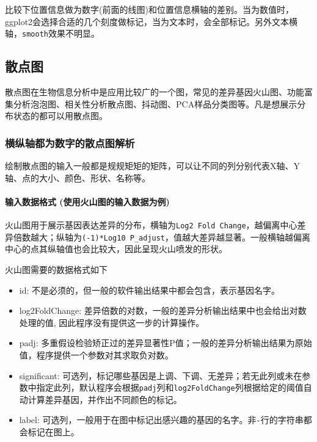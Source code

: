 \documentclass[]{article}
\providecommand{\tightlist}{%
  \setlength{\itemsep}{0pt}\setlength{\parskip}{0pt}}
\numberwithin{figure}{section}
\numberwithin{table}{section}
\theoremstyle{definition}
\theoremstyle{definition}
\theoremstyle{definition}
\theoremstyle{remark}
\begin{document}
比较下位置信息做为数字(前面的线图)和位置信息横轴的差别。当为数值时，ggplot2会选择合适的几个刻度做标记，当为文本时，会全部标记。另外文本横轴，\texttt{smooth}效果不明显。

\subsection{散点图}

散点图在生物信息分析中是应用比较广的一个图，常见的差异基因火山图、功能富集分析泡泡图、相关性分析散点图、抖动图、PCA样品分类图等。凡是想展示分布状态的都可以用散点图。

\subsubsection{横纵轴都为数字的散点图解析}

绘制散点图的输入一般都是规规矩矩的矩阵，可以让不同的列分别代表X轴、Y轴、点的大小、颜色、形状、名称等。

\paragraph{输入数据格式 (使用火山图的输入数据为例)}\label{-}

火山图用于展示基因表达差异的分布，横轴为\texttt{Log2\ Fold\ Change}，越偏离中心差异倍数越大；纵轴为\texttt{(-1)*Log10\ P\_adjust}，值越大差异越显著。一般横轴越偏离中心的点其纵轴值也会比较大，因此呈现火山喷发的形状。

火山图需要的数据格式如下

\begin{itemize}
\tightlist
\item
  id: 不是必须的，但一般的软件输出结果中都会包含，表示基因名字。
\item
  log2FoldChange:
  差异倍数的对数，一般的差异分析输出结果中也会给出对数处理的值,
  因此程序没有提供这一步的计算操作。
\item
  padj:
  多重假设检验矫正过的差异显著性P值；一般的差异分析输出结果为原始值，程序提供一个参数对其求取负对数。
\item
  significant:
  可选列，标记哪些基因是上调、下调、无差异；若无此列或未在参数中指定此列，默认程序会根据\texttt{padj}列和\texttt{log2FoldChange}列根据给定的阈值自动计算差异基因，并作出不同颜色的标记。
\item
  label:
  可选列，一般用于在图中标记出感兴趣的基因的名字。非\texttt{-}行的字符串都会标记在图上。
\end{itemize}
\end{document}
